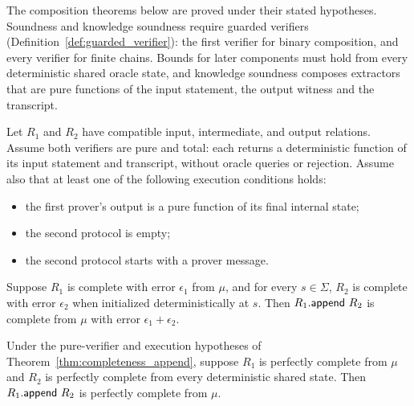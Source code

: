 The composition theorems below are proved under their stated hypotheses. Soundness and
knowledge soundness require guarded verifiers (Definition~\ref{def:guarded_verifier}): the first
verifier for binary composition, and every verifier for finite chains. Bounds for later components
must hold from every deterministic shared oracle state, and knowledge soundness composes extractors
that are pure functions of the input statement, the output witness and the transcript.

\begin{theorem}
    \label{thm:completeness_append}
    Let $R_1$ and $R_2$ have compatible input, intermediate, and output relations.
    Assume both verifiers are pure and total: each returns a deterministic function of its input
    statement and transcript, without oracle queries or rejection. Assume also that at least one
    of the following execution conditions holds:
    \begin{itemize}
        \item the first prover's output is a pure function of its final internal state;
        \item the second protocol is empty;
        \item the second protocol starts with a prover message.
    \end{itemize}
    Suppose $R_1$ is complete with error $\epsilon_1$ from $\mu$, and for every $s \in \Sigma$,
    $R_2$ is complete with error $\epsilon_2$ when initialized deterministically at $s$.
    Then $R_1.\mathsf{append}\ R_2$ is complete from $\mu$ with error $\epsilon_1 + \epsilon_2$.
    \leanok
\end{theorem}

\begin{theorem}
    \label{thm:perfect_completeness_append}
    Under the pure-verifier and execution hypotheses of
    Theorem~\ref{thm:completeness_append}, suppose $R_1$ is perfectly complete from $\mu$ and
    $R_2$ is perfectly complete from every deterministic shared state.
    Then $R_1.\mathsf{append}\ R_2$ is perfectly complete from $\mu$.
    \leanok
\end{theorem}


